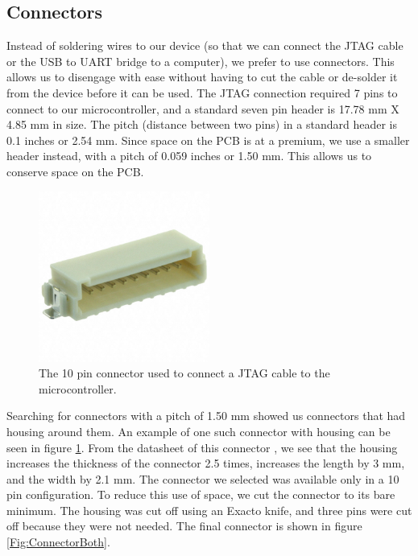 \subsection{Connectors}
\label{Sec:Connetors}
Instead of soldering wires to our device (so that we can connect the JTAG cable or the USB to UART bridge to a computer), we prefer to use connectors. This allows us to disengage with ease without having to cut the cable or de-solder it from the device before it can be used. The JTAG connection required 7 pins to connect to our microcontroller, and a standard seven pin header is 17.78 mm X 4.85 mm in size. The pitch (distance between two pins) in a standard header is 0.1 inches or 2.54 mm. Since space on the PCB is at a premium, we use a smaller header instead, with a pitch of 0.059 inches or 1.50 mm. This allows us to conserve space on the PCB.
\begin{figure}
\begin{center}
\includegraphics[width=0.5\textwidth]{images/ConnectorWhole.JPG}
\caption{The 10 pin connector used to connect a JTAG cable to the microcontroller.}
\label{Fig:ConnectorWhole}
\end{center}
\end{figure}
Searching for connectors with a pitch of 1.50 mm showed us connectors that had housing around them.
An example of one such connector with housing can be seen in figure \ref{Fig:ConnectorWhole}.
From the datasheet of this connector \cite{Datasheet:TEConnHeader},
we see that the housing increases the thickness of the connector 2.5 times,
increases the length by 3 mm,
and the width by 2.1 mm. The connector we selected was available only in a 10 pin configuration.
To reduce this use of space, we cut the connector to its bare minimum.
The housing was cut off using an Exacto knife,
and three pins were cut off because they were not needed.
The final connector is shown in figure \ref{Fig:ConnectorBoth}.
